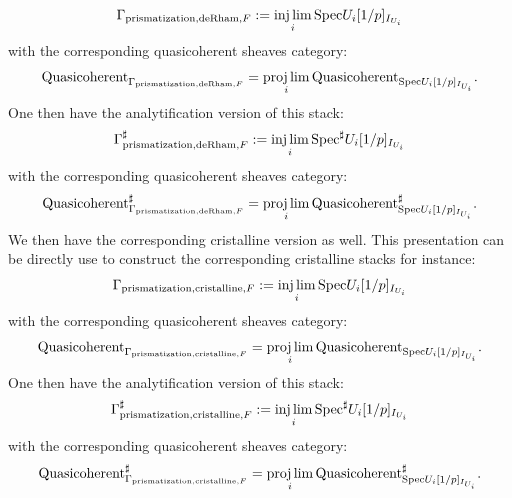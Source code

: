 \documentclass[12pt]{article}
\theoremstyle{definition}
\begin{document}
\begin{align}
\mathrm{\Gamma}_{\mathrm{prismatization},\mathrm{deRham},F}:=\injlim_i \mathrm{Spec}U_i[1/p]_{I_{U_i}}
\end{align}
with the corresponding quasicoherent sheaves category:
\begin{align}
\mathrm{Quasicoherent}_{\mathrm{\Gamma}_{\mathrm{prismatization},\mathrm{deRham},F}}=\projlim_i \mathrm{Quasicoherent}_{\mathrm{Spec}U_i[1/p]_{I_{U_i}}}.
\end{align}
One then have the analytification version of this stack:
\begin{align}
\mathrm{\Gamma}^\sharp_{\mathrm{prismatization},\mathrm{deRham},F}:=\injlim_i \mathrm{Spec}^\sharp U_i[1/p]_{I_{U_i}}
\end{align}
with the corresponding quasicoherent sheaves category:
\begin{align}
\mathrm{Quasicoherent}^\sharp_{\mathrm{\Gamma}_{\mathrm{prismatization},\mathrm{deRham},F}}=\projlim_i \mathrm{Quasicoherent}^\sharp_{\mathrm{Spec}U_i[1/p]_{I_{U_i}}}.
\end{align}
We then have the corresponding cristalline version as well. This presentation can be directly use to construct the corresponding cristalline stacks for instance:
\begin{align}
\mathrm{\Gamma}_{\mathrm{prismatization},\mathrm{cristalline},F}:=\injlim_i \mathrm{Spec}U_i[1/p]_{I_{U_i}}
\end{align}
with the corresponding quasicoherent sheaves category:
\begin{align}
\mathrm{Quasicoherent}_{\mathrm{\Gamma}_{\mathrm{prismatization},\mathrm{cristalline},F}}=\projlim_i \mathrm{Quasicoherent}_{\mathrm{Spec}U_i[1/p]_{I_{U_i}}}.
\end{align}
One then have the analytification version of this stack:
\begin{align}
\mathrm{\Gamma}^\sharp_{\mathrm{prismatization},\mathrm{cristalline},F}:=\injlim_i \mathrm{Spec}^\sharp U_i[1/p]_{I_{U_i}}
\end{align}
with the corresponding quasicoherent sheaves category:
\begin{align}
\mathrm{Quasicoherent}^\sharp_{\mathrm{\Gamma}_{\mathrm{prismatization},\mathrm{cristalline},F}}=\projlim_i \mathrm{Quasicoherent}^\sharp_{\mathrm{Spec}U_i[1/p]_{I_{U_i}}}.
\end{align} 
\end{document}
